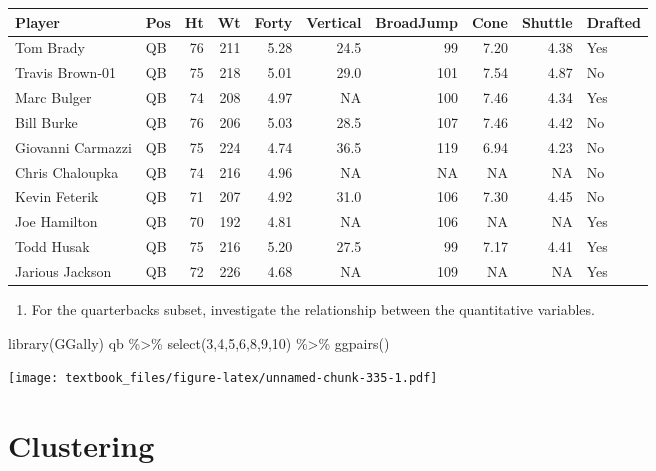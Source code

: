 \documentclass[
  11pt,
]{book}
\newenvironment{Shaded}{\begin{snugshade}}{\end{snugshade}}
\newcommand{\DecValTok}[1]{\textcolor[rgb]{0.00,0.00,0.81}{#1}}
\newcommand{\FunctionTok}[1]{\textcolor[rgb]{0.00,0.00,0.00}{#1}}
\newcommand{\NormalTok}[1]{#1}
\newcommand{\SpecialCharTok}[1]{\textcolor[rgb]{0.00,0.00,0.00}{#1}}
\providecommand{\tightlist}{%
  \setlength{\itemsep}{0pt}\setlength{\parskip}{0pt}}
\theoremstyle{definition}
\theoremstyle{definition}
\theoremstyle{definition}
\theoremstyle{definition}
\theoremstyle{remark}
\begin{document}
\begin{tabular}{llrrrrrrrl}
\toprule
Player & Pos & Ht & Wt & Forty & Vertical & BroadJump & Cone & Shuttle & Drafted\\
\midrule
Tom Brady & QB & 76 & 211 & 5.28 & 24.5 & 99 & 7.20 & 4.38 & Yes\\
Travis Brown-01 & QB & 75 & 218 & 5.01 & 29.0 & 101 & 7.54 & 4.87 & No\\
Marc Bulger & QB & 74 & 208 & 4.97 & NA & 100 & 7.46 & 4.34 & Yes\\
Bill Burke & QB & 76 & 206 & 5.03 & 28.5 & 107 & 7.46 & 4.42 & No\\
Giovanni Carmazzi & QB & 75 & 224 & 4.74 & 36.5 & 119 & 6.94 & 4.23 & No\\
Chris Chaloupka & QB & 74 & 216 & 4.96 & NA & NA & NA & NA & No\\
Kevin Feterik & QB & 71 & 207 & 4.92 & 31.0 & 106 & 7.30 & 4.45 & No\\
Joe Hamilton & QB & 70 & 192 & 4.81 & NA & 106 & NA & NA & Yes\\
Todd Husak & QB & 75 & 216 & 5.20 & 27.5 & 99 & 7.17 & 4.41 & Yes\\
Jarious Jackson & QB & 72 & 226 & 4.68 & NA & 109 & NA & NA & Yes\\
\bottomrule
\end{tabular}

\begin{enumerate}
\def\labelenumi{(\alph{enumi})}
\setcounter{enumi}{7}
\tightlist
\item
  For the quarterbacks subset, investigate the relationship between the quantitative variables.
\end{enumerate}

\begin{Shaded}
\begin{Highlighting}[]
\FunctionTok{library}\NormalTok{(GGally)}
\NormalTok{qb }\SpecialCharTok{\%\textgreater{}\%} \FunctionTok{select}\NormalTok{(}\DecValTok{3}\NormalTok{,}\DecValTok{4}\NormalTok{,}\DecValTok{5}\NormalTok{,}\DecValTok{6}\NormalTok{,}\DecValTok{8}\NormalTok{,}\DecValTok{9}\NormalTok{,}\DecValTok{10}\NormalTok{) }\SpecialCharTok{\%\textgreater{}\%} \FunctionTok{ggpairs}\NormalTok{()}
\end{Highlighting}
\end{Shaded}

\texttt{[image: textbook\_files/figure-latex/unnamed-chunk-335-1.pdf]}

\newpage

\hypertarget{clustering}{%
\chapter{Clustering}\label{clustering}}
\end{document}
